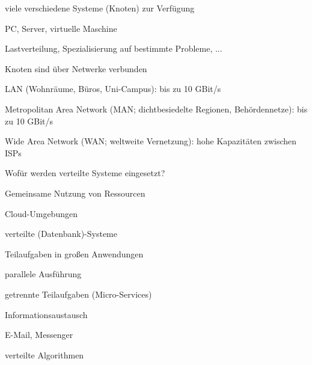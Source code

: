 \documentclass[10pt]{article}
\begin{document}
\begin{itemize*}
  \item viele verschiedene Systeme (Knoten) zur Verfügung
  \begin{itemize*}
    \item PC, Server, virtuelle Maschine
    \item Lastverteilung, Spezialisierung auf bestimmte Probleme, ...
  \end{itemize*}
  \item Knoten sind über Netwerke verbunden
  \begin{itemize*}
    \item LAN (Wohnräume, Büros, Uni-Campus): bis zu 10 GBit/s
    \item Metropolitan Area Network (MAN; dichtbesiedelte Regionen, Behördennetze): bis zu 10 GBit/s
    \item Wide Area Network (WAN; weltweite Vernetzung): hohe Kapazitäten zwischen ISPs
  \end{itemize*}
\end{itemize*}

Wofür werden verteilte Systeme eingesetzt?
\begin{itemize*}
  \item Gemeinsame Nutzung von Ressourcen
  \begin{itemize*}
    \item Cloud-Umgebungen
    \item verteilte (Datenbank)-Systeme
  \end{itemize*}
  \item Teilaufgaben in großen Anwendungen
  \begin{itemize*}
    \item parallele Ausführung
    \item getrennte Teilaufgaben (Micro-Services)
  \end{itemize*}
  \item Informationsaustausch
  \begin{itemize*}
    \item E-Mail, Messenger
    \item verteilte Algorithmen
  \end{itemize*}
\end{itemize*}
\end{document}

